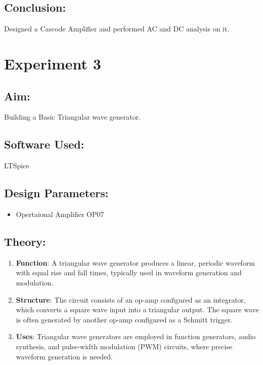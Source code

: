 \documentclass[a4paper,12pt]{report}
\begin{document}
  \vspace{0.3cm}

  \subsection{Conclusion:} 
    \hspace{20pt}Designed a Cascode Amplifier and performed AC and DC analysis on it.

  \newpage

\section{Experiment 3}

  \subsection{Aim:}
    \hspace{20pt}Building a Basic Triangular wave generator.

  \vspace{0.3cm} %

  \subsection{Software Used:} 
    \hspace{20pt}LTSpice

  \vspace{0.3cm}

  \subsection{Design Parameters:}
    \begin{itemize}
        \item Opertaional Amplifier OP07
    \end{itemize}

  \vspace{0.3cm}

  \subsection{Theory:} 
    \begin{enumerate}
        \item \textbf{Function}: A triangular wave generator produces a linear, periodic waveform with equal rise and fall times, typically used in waveform generation and modulation.

        \item \textbf{Structure}: The circuit consists of an op-amp configured as an integrator, which converts a square wave input into a triangular output. The square wave is often generated by another op-amp configured as a Schmitt trigger.

        \item \textbf{Uses}: Triangular wave generators are employed in function generators, audio synthesis, and pulse-width modulation (PWM) circuits, where precise waveform generation is needed.
    \end{enumerate}
\end{document}
